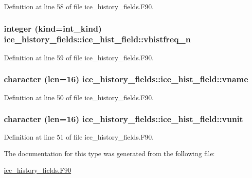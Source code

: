 Definition at line 58 of file ice\_\-history\_\-fields.F90.\hypertarget{typeice__history__fields_1_1ice__hist__field_a9ffe2d3c9f280e42e9dedc8ef6ab13f9}{
\subsubsection[{vhistfreq\_\-n}]{\setlength{\rightskip}{0pt plus 5cm}integer (kind=int\_\-kind) {\bf ice\_\-history\_\-fields::ice\_\-hist\_\-field::vhistfreq\_\-n}}}
\label{typeice__history__fields_1_1ice__hist__field_a9ffe2d3c9f280e42e9dedc8ef6ab13f9}


Definition at line 59 of file ice\_\-history\_\-fields.F90.\hypertarget{typeice__history__fields_1_1ice__hist__field_a7f72b9a3cd90b1af48cf8e455ccd8f3c}{
\subsubsection[{vname}]{\setlength{\rightskip}{0pt plus 5cm}character (len=16) {\bf ice\_\-history\_\-fields::ice\_\-hist\_\-field::vname}}}
\label{typeice__history__fields_1_1ice__hist__field_a7f72b9a3cd90b1af48cf8e455ccd8f3c}


Definition at line 50 of file ice\_\-history\_\-fields.F90.\hypertarget{typeice__history__fields_1_1ice__hist__field_ac72b8c03aabe26919c0113a4430736d4}{
\subsubsection[{vunit}]{\setlength{\rightskip}{0pt plus 5cm}character (len=16) {\bf ice\_\-history\_\-fields::ice\_\-hist\_\-field::vunit}}}
\label{typeice__history__fields_1_1ice__hist__field_ac72b8c03aabe26919c0113a4430736d4}


Definition at line 51 of file ice\_\-history\_\-fields.F90.

The documentation for this type was generated from the following file:\begin{DoxyCompactItemize}
\item 
\hyperlink{ice__history__fields_8F90}{ice\_\-history\_\-fields.F90}\end{DoxyCompactItemize}
